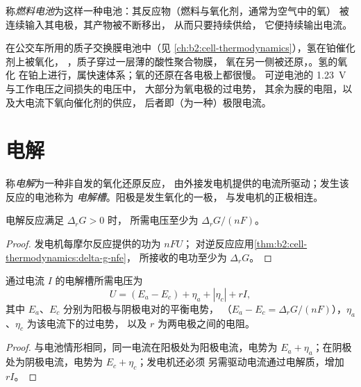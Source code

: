 \begin{definition}[燃料电池]\label{def:b2:batteries-electrolysis:fuel-cell}
称\emph{燃料电池}为这样一种电池：其反应物（燃料与氧化剂，通常为空气中的氧）
被连续输入其电极，其产物被不断移出，
从而只要持续供给，
它便持续输出电流。
\end{definition}

在公交车所用的质子交换膜电池中（见
\cref{ch:b2:cell-thermodynamics}），氢在铂催化剂上被氧化，
，质子穿过一层薄的酸性聚合物膜，
氧在另一侧被还原，。氢的氧化
在铂上进行，属快速体系；氧的还原在各电极上都很慢。
可逆电池的 \qty{1.23}{V} 与工作电压之间损失的电压中，
大部分为氧电极的过电势，
其余为膜的电阻，以及大电流下氧向催化剂的供应，
后者即（为一种）极限电流。

\section{电解}

\begin{definition}[电解]\label{def:b2:batteries-electrolysis:electrolysis}
称\emph{电解}为一种非自发的氧化还原反应，
由外接发电机提供的电流所驱动；发生该反应的电池称为
\emph{电解槽}。阳极是发生氧化的一极，
与发电机的正极相连。
\end{definition}

\begin{proposition}[热力学最小电压]\label{prop:b2:batteries-electrolysis:minimum-voltage}
电解反应满足 $\Delta_r G > 0$ 时，
所需电压至少为 $\Delta_r G/(nF)$。
\end{proposition}

\begin{proof}
发电机每摩尔反应提供的功为 $nFU$；
对逆反应应用\cref{thm:b2:cell-thermodynamics:delta-g-nfe}，
所接收的电功至少为 $\Delta_r G$。
\end{proof}

\begin{proposition}[电解槽的电压]\label{prop:b2:batteries-electrolysis:electrolysis-voltage}
通过电流 $I$ 的电解槽所需电压为
\[
  U = (E_a - E_c) + \eta_a + |\eta_c| + rI ,
\]
其中 $E_a$、$E_c$ 分别为阳极与阴极电对的平衡电势，
（$E_a - E_c = \Delta_r G/(nF)$），$\eta_a$、$\eta_c$ 为该电流下的过电势，
以及 $r$ 为两电极之间的电阻。
\end{proposition}

\begin{proof}
与电池情形相同，同一电流在阳极处为阳极电流，电势为 $E_a +
\eta_a$；在阴极处为阴极电流，电势为 $E_c + \eta_c$；发电机还必须
另需驱动电流通过电解质，增加 $rI$。
\end{proof}

